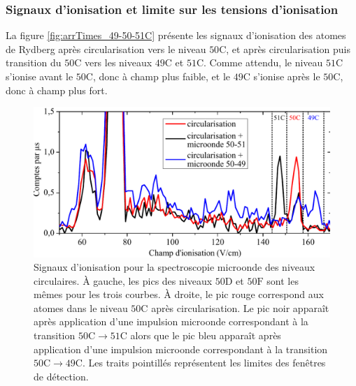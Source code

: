 	\subsubsection*{Signaux d'ionisation et limite sur les tensions d'ionisation}
\noindent La figure \eqref{fig:arrTimes_49-50-51C} présente les signaux d'ionisation des atomes de Rydberg après circularisation vers le niveau $\mathrm{50C}$, et après circularisation puis transition du $\mathrm{50C}$ vers les niveaux $\mathrm{49C}$ et $\mathrm{51C}$.
Comme attendu, le niveau $\mathrm{51C}$ s'ionise avant le $\mathrm{50C}$, donc à champ plus faible, et le $\mathrm{49C}$ s'ionise après le $\mathrm{50C}$, donc à champ plus fort.

\begin{figure}[!h]
\centering
\includegraphics[width=\linewidth]{figures/circulars/arrTimes_49-50-51C}
\caption[Signaux d'ionisation pour la spectroscopie microonde des niveaux circulaires]{
Signaux d'ionisation pour la spectroscopie microonde des niveaux circulaires.
À gauche, les pics des niveaux $\mathrm{50D}$ et $\mathrm{50F}$ sont les mêmes pour les trois courbes.
À droite, le pic rouge correspond aux atomes dans le niveau $\mathrm{50C}$ après circularisation.
Le pic noir apparaît après application d'une impulsion microonde correspondant à la transition $\mathrm{50C}\rightarrow \mathrm{51C}$ alors que le pic bleu apparaît après application d'une impulsion microonde correspondant à la transition $\mathrm{50C}\rightarrow \mathrm{49C}$.
Les traits pointillés représentent les limites des fenêtres de détection.
}
\label{fig:arrTimes_49-50-51C}
\end{figure}


